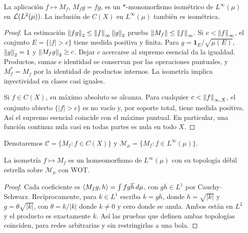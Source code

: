 \begin{proposicion}\label{v3:multiplicacion-isometrica}
La aplicación $f\mapsto M_f$, $M_fg=fg$, es un $*$-monomorfismo isométrico de $L^\infty(\mu)$ en $\mathcal L(L^2(\mu))$. La inclusión de $C(X)$ en $L^\infty(\mu)$ también es isométrica.
\end{proposicion}
\begin{proof}
La estimación $\left\lVert fg\right\rVert_2\le\left\lVert f\right\rVert_\infty\left\lVert g\right\rVert_2$ prueba $\left\lVert M_f\right\rVert\le\left\lVert f\right\rVert_\infty$. Si $c<\left\lVert f\right\rVert_\infty$, el conjunto $E=\{|f|>c\}$ tiene medida positiva y finita. Para $g=\mathbf1_E/\sqrt{\mu(E)}$, $\left\lVert g\right\rVert_2=1$ y $\left\lVert M_fg\right\rVert_2\ge c$. Dejar $c$ acercarse al supremo esencial da la igualdad. Productos, sumas e identidad se conservan por las operaciones puntuales, y $M_f^*=M_{\overline f}$ por la identidad de productos internos. La isometría implica inyectividad en clases casi iguales.

Si $f\in C(X)$, su máximo absoluto se alcanza. Para cualquier $c<\left\lVert f\right\rVert_{\infty,X}$, el conjunto abierto $\{|f|>c\}$ es no vacío y, por soporte total, tiene medida positiva. Así el supremo esencial coincide con el máximo puntual. En particular, una función continua nula casi en todas partes es nula en todo $X$.
\end{proof}

Denotaremos $\mathcal C=\{M_f:f\in C(X)\}$ y $\mathcal M_\mu=\{M_f:f\in L^\infty(\mu)\}$.

\begin{teorema}\label{v3:weakstar-wot-multiplicadores}
La isometría $f\mapsto M_f$ es un homeomorfismo de $L^\infty(\mu)$ con su topología débil estrella sobre $\mathcal M_\mu$ con WOT.
\end{teorema}
\begin{proof}
Cada coeficiente es $\left\langle M_fg,h\right\rangle=\int f g\overline h\,d\mu$, con $g\overline h\in L^1$ por Cauchy--Schwarz. Recíprocamente, para $k\in L^1$ escriba $k=g\overline h$, donde $h=\sqrt{|k|}$ y $g=\theta\sqrt{|k|}$, con $\theta=k/|k|$ donde $k\ne0$ y cero donde se anula. Ambos están en $L^2$ y el producto es exactamente $k$. Así las pruebas que definen ambas topologías coinciden, para redes arbitrarias y sin restringirlas a una bola.
\end{proof}

